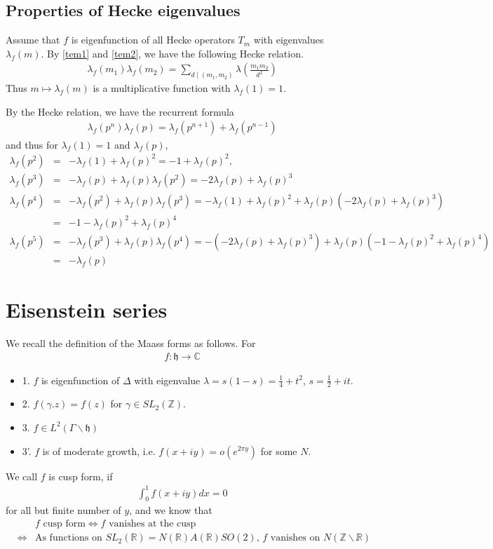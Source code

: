 \documentclass[11pt,reqno]{amsart}
\newcommand{\bea}{\begin{eqnarray}}
\newcommand{\eea}{\end{eqnarray}}
\newcommand{\bna}{\begin{eqnarray*}}
\newcommand{\ena}{\end{eqnarray*}}
\newcommand{\mk}{\mathfrak}
\def\C{\mathbb{C}}
\def\R{\mathbb{R}}
\def\Z{\mathbb{Z}}
\theoremstyle{definition}
\newcommand{\bit}{\begin{itemize}}
\newcommand{\eit}{\end{itemize}}
\begin{document}
 \subsection{Properties of Hecke eigenvalues}
Assume that $f$ is eigenfunction of all Hecke operators $T_m$
with eigenvalues $\lambda_f(m)$.
 By \eqref{tem1} and \eqref{tem2}, we have the following Hecke relation.
\bea
\lambda_f(m_1)\lambda_f(m_2)=\sum_{d\mid (m_1,m_2)}\lambda\left(\frac{m_1m_2}{d^2}\right)
\eea
Thus $m\mapsto \lambda_f(m)$ is a multiplicative function with $\lambda_f(1)=1$.

By the Hecke relation, we have the recurrent formula
\bna
\lambda_f(p^n)\lambda_f(p)=\lambda_f(p^{n+1})+\lambda_f(p^{n-1})
\ena
and thus for $\lambda_f(1)=1$ and $\lambda_f(p)$,
\bna
\lambda_f(p^2)&=&-\lambda_f(1)+\lambda_f(p)^2=-1+\lambda_f(p)^2,\\
\lambda_f(p^3)&=&-\lambda_f(p)+\lambda_f(p)\lambda_f(p^2)
=-2\lambda_f(p)+\lambda_f(p)^3\\
\lambda_f(p^4)&=&-\lambda_f(p^2)+\lambda_f(p)\lambda_f(p^3)
=-\lambda_f(1)+\lambda_f(p)^2+\lambda_f(p)\left(-2\lambda_f(p)+\lambda_f(p)^3\right)\\
&=&-1-\lambda_f(p)^2+\lambda_f(p)^4\\
\lambda_f(p^5)&=&-\lambda_f(p^3)+\lambda_f(p)\lambda_f(p^4)
=-(-2\lambda_f(p)+\lambda_f(p)^3)+\lambda_f(p)(-1-\lambda_f(p)^2+\lambda_f(p)^4)\\
&=&-\lambda_f(p)
\ena

\section{Eisenstein series}
We recall the definition of the Maass forms as follows.
For
\bna
f:\mk h\rightarrow\C
\ena
\bit
\item [1.] $f$ is eigenfunction of $\Delta$ with eigenvalue $\lambda=s(1-s)=\frac{1}{4}+t^2$, $s=\frac{1}{2}+it$.
\item [2.] $f(\gamma.z)=f(z)$ for $\gamma\in SL_2(\Z)$.
\item [3.] $f\in L^2(\Gamma\backslash \mk h)$
\item [3'.] $f$ is of moderate growth, i.e. $f(x+iy)=o(e^{2\pi y})$ for some $N$.
\eit
We call $f$ is cusp form, if
\bna
\int_{0}^1f(x+iy)dx=0
\ena
for all but finite number of $y$, and we know that
\bna
&&\mbox{$f$ cusp form}\Leftrightarrow \mbox{$f$ vanishes at the cusp}\\
&\Leftrightarrow&\mbox{As functions on $SL_2(\R)=N(\R)A(\R)SO(2)$, $f$ vanishes
on $N(\Z\backslash \R)$}.
\ena
\medskip
\end{document}
